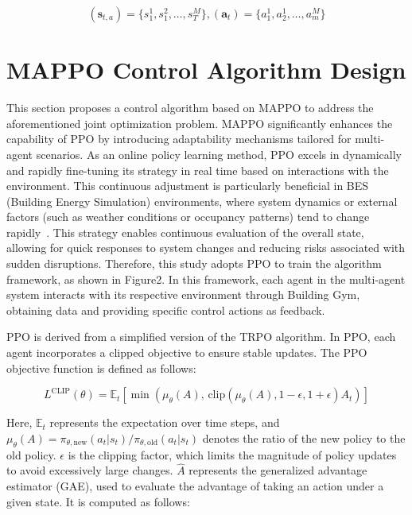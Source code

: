 \documentclass[preprint,12pt]{elsarticle}
\begin{document}
\begin{equation}
(\mathbf{s}_{t,a}) = \{s_1^1, s_1^2, \ldots, s_T^M\}, (\mathbf{a}_t) = \{a_1^1, a_2^1, \ldots, a_m^M\}
\end{equation}

\section{MAPPO Control Algorithm Design}

This section proposes a control algorithm based on MAPPO to address the aforementioned 
joint optimization problem. MAPPO significantly enhances the capability of PPO 
by introducing adaptability mechanisms tailored for multi-agent scenarios. As an online 
policy learning method, PPO excels in dynamically and rapidly fine-tuning its strategy in 
real time based on interactions with the environment. This continuous adjustment is 
particularly beneficial in BES (Building Energy Simulation) environments, where system 
dynamics or external factors (such as weather conditions or occupancy patterns) tend to change 
rapidly~\cite{ref22}. This strategy enables continuous evaluation of the overall state, 
allowing for quick responses to system changes and reducing risks associated with sudden disruptions. 
Therefore, this study adopts PPO to train the algorithm framework, as shown in Figure2. 
In this framework, each agent in the multi-agent system interacts with its respective environment 
through Building Gym, obtaining data and providing specific control actions as feedback.

PPO is derived from a simplified version of the TRPO algorithm. In PPO, each agent incorporates a 
clipped objective to ensure stable updates. The PPO objective function is defined as follows:

\begin{equation}
L^{\text{CLIP}}(\theta) = \mathbb{E}_t \left[ \min \left( \mu_\theta(A), \, \text{clip}(\mu_\theta(A), 1 - \epsilon, 1 + \epsilon) A_t \right) \right]
\end{equation}

Here, $\mathbb{E}_t$ represents the expectation over time steps, 
and $\mu_\theta(A) = \pi_{\theta,\text{new}}(a_t | s_t) / \pi_{\theta,\text{old}}(a_t | s_t)$
 denotes the ratio of the new policy to the old policy. $\epsilon$ is the clipping factor, 
 which limits the magnitude of policy updates to avoid excessively large changes. 
 $\hat{A}$ represents the generalized advantage estimator (GAE), used to evaluate the 
 advantage of taking an action under a given state. It is computed as follows:
\end{document}
